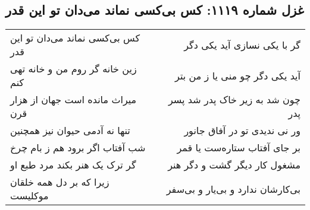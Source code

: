\begin{center}
\section*{غزل شماره ۱۱۱۹: کس بی‌کسی نماند می‌دان تو این قدر}
\label{sec:1119}
\begin{longtable}{l p{0.5cm} r}
کس بی‌کسی نماند می‌دان تو این قدر
&&
گر با یکی نسازی آید یکی دگر
\\
زین خانه گر روم من و خانه تهی کنم
&&
آید یکی دگر چو منی یا ز من بتر
\\
میراث مانده است جهان از هزار قرن
&&
چون شد به زیر خاک پدر شد پسر پدر
\\
تنها نه آدمی حیوان نیز همچنین
&&
ور نی ندیدی تو در آفاق جانور
\\
شب آفتاب اگر برود هم ز بام چرخ
&&
بر جای آفتاب ستاره‌ست یا قمر
\\
گر ترک یک هنر بکند مرد طبع او
&&
مشغول کار دیگر گشت و دگر هنر
\\
زیرا که بر دل همه خلقان موکلیست
&&
بی‌کارشان ندارد و بی‌یار و بی‌سفر
\\
\end{longtable}
\end{center}

